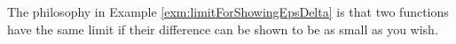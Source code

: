 \begin{rem}
  The philosophy in Example \ref{exm:limitForShowingEpsDelta}
  is that two functions have the same limit
  if their difference can be shown to be as small as you wish.
\end{rem}







